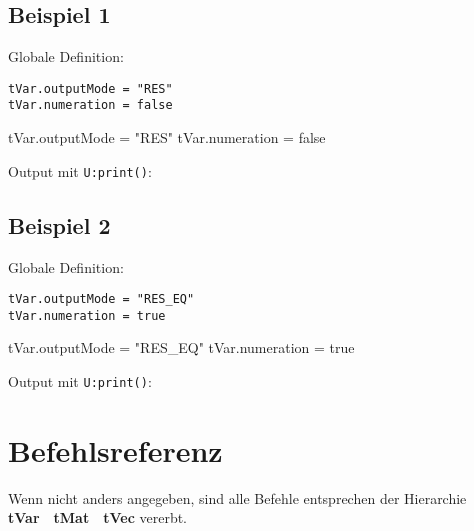 \subsection{Beispiel 1}
Globale Definition:
\begin{lstlisting}
tVar.outputMode = "RES"
tVar.numeration = false
\end{lstlisting}
\begin{luacode*}
tVar.outputMode = "RES"
tVar.numeration = false
\end{luacode*}
Output mit \lstinline{U:print()}:
\subsection{Beispiel 2}
Globale Definition:
\begin{lstlisting}
tVar.outputMode = "RES_EQ"
tVar.numeration = true
\end{lstlisting}
\begin{luacode*}
tVar.outputMode = "RES_EQ"
tVar.numeration = true
\end{luacode*}
Output mit \lstinline{U:print()}:
\newpage\section{Befehlsreferenz}
Wenn nicht anders angegeben, sind alle Befehle entsprechen der Hierarchie \textbf{tVar}~\Rightarrow~\textbf{tMat}~\Rightarrow~\textbf{tVec} vererbt.
